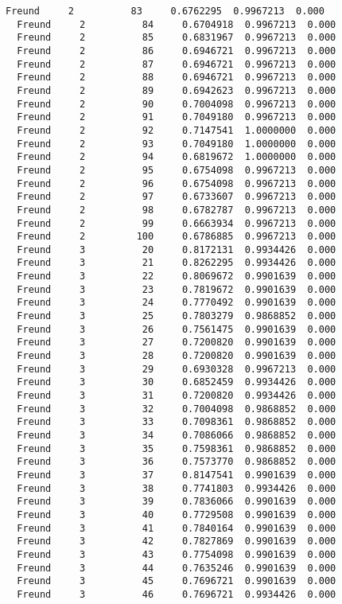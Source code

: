 \documentclass[11pt]{article}
\begin{document}
\begin{Verbatim}[commandchars=\\\{\}]
  Freund     2          83     0.6762295  0.9967213  0.000
  Freund     2          84     0.6704918  0.9967213  0.000
  Freund     2          85     0.6831967  0.9967213  0.000
  Freund     2          86     0.6946721  0.9967213  0.000
  Freund     2          87     0.6946721  0.9967213  0.000
  Freund     2          88     0.6946721  0.9967213  0.000
  Freund     2          89     0.6942623  0.9967213  0.000
  Freund     2          90     0.7004098  0.9967213  0.000
  Freund     2          91     0.7049180  0.9967213  0.000
  Freund     2          92     0.7147541  1.0000000  0.000
  Freund     2          93     0.7049180  1.0000000  0.000
  Freund     2          94     0.6819672  1.0000000  0.000
  Freund     2          95     0.6754098  0.9967213  0.000
  Freund     2          96     0.6754098  0.9967213  0.000
  Freund     2          97     0.6733607  0.9967213  0.000
  Freund     2          98     0.6782787  0.9967213  0.000
  Freund     2          99     0.6663934  0.9967213  0.000
  Freund     2         100     0.6786885  0.9967213  0.000
  Freund     3          20     0.8172131  0.9934426  0.000
  Freund     3          21     0.8262295  0.9934426  0.000
  Freund     3          22     0.8069672  0.9901639  0.000
  Freund     3          23     0.7819672  0.9901639  0.000
  Freund     3          24     0.7770492  0.9901639  0.000
  Freund     3          25     0.7803279  0.9868852  0.000
  Freund     3          26     0.7561475  0.9901639  0.000
  Freund     3          27     0.7200820  0.9901639  0.000
  Freund     3          28     0.7200820  0.9901639  0.000
  Freund     3          29     0.6930328  0.9967213  0.000
  Freund     3          30     0.6852459  0.9934426  0.000
  Freund     3          31     0.7200820  0.9934426  0.000
  Freund     3          32     0.7004098  0.9868852  0.000
  Freund     3          33     0.7098361  0.9868852  0.000
  Freund     3          34     0.7086066  0.9868852  0.000
  Freund     3          35     0.7598361  0.9868852  0.000
  Freund     3          36     0.7573770  0.9868852  0.000
  Freund     3          37     0.8147541  0.9901639  0.000
  Freund     3          38     0.7741803  0.9934426  0.000
  Freund     3          39     0.7836066  0.9901639  0.000
  Freund     3          40     0.7729508  0.9901639  0.000
  Freund     3          41     0.7840164  0.9901639  0.000
  Freund     3          42     0.7827869  0.9901639  0.000
  Freund     3          43     0.7754098  0.9901639  0.000
  Freund     3          44     0.7635246  0.9901639  0.000
  Freund     3          45     0.7696721  0.9901639  0.000
  Freund     3          46     0.7696721  0.9934426  0.000

\end{Verbatim}
\end{document}

